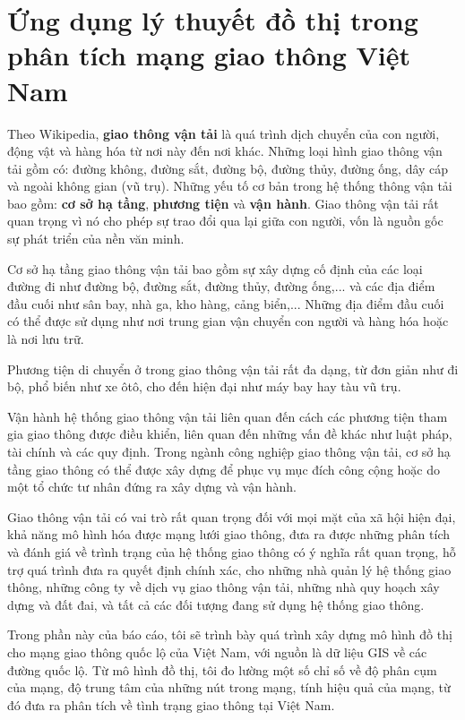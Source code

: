 \documentclass[14pt, oneside, a4paper, openany]{scrartcl}
\begin{document}
\newpage
\section{Ứng dụng lý thuyết đồ thị trong phân tích mạng giao thông Việt Nam}
Theo Wikipedia, \textbf{giao thông vận tải}  là quá trình dịch chuyển của con người, động vật và hàng hóa từ nơi này đến nơi khác. Những loại hình giao thông vận tải gồm có: đường không, đường sắt, đường bộ, đường thủy, đường ống, dây cáp và ngoài không gian (vũ trụ). Những yếu tố cơ bản trong hệ thống thông vận tải bao gồm: \textbf{cơ sở hạ tầng}, \textbf{phương tiện} và \textbf{vận hành}. Giao thông vận tải rất quan trọng vì nó cho phép sự trao đổi qua lại giữa con người, vốn là nguồn gốc sự phát triển của nền văn minh.

Cơ sở hạ tầng giao thông vận tải bao gồm sự xây dựng cố định của các loại đường đi như đường bộ, đường sắt, đường thủy, đường ống,... và các địa điểm đầu cuối như sân bay, nhà ga, kho hàng, cảng biển,... Những địa điểm đầu cuối có thể được sử dụng như nơi trung gian vận chuyển con người và hàng hóa hoặc là nơi lưu trữ.

Phương tiện di chuyển ở trong giao thông vận tải rất đa dạng, từ đơn giản như đi bộ, phổ biến như xe ôtô, cho đến hiện đại như máy bay hay tàu vũ trụ.

Vận hành hệ thống giao thông vận tải liên quan đến cách các phương tiện tham gia giao thông được điều khiển, liên quan đến những vấn đề khác như luật pháp, tài chính và các quy định. Trong ngành công nghiệp giao thông vận tải, cơ sở hạ tầng giao thông có thể được xây dựng để phục vụ mục đích công cộng hoặc do một tổ chức tư nhân đứng ra xây dựng và vận hành.

Giao thông vận tải có vai trò rất quan trọng đối với mọi mặt của xã hội hiện đại, khả năng mô hình hóa được mạng lưới giao thông, đưa ra được những phân tích và đánh giá về trình trạng của hệ thống giao thông có ý nghĩa rất quan trọng, hỗ trợ quá trình đưa ra quyết định chính xác, cho những nhà quản lý hệ thống giao thông, những công ty về dịch vụ giao thông vận tải, những nhà quy hoạch xây dựng và đất đai, và tất cả các đối tượng đang sử dụng hệ thống giao thông.

Trong phần này của báo cáo, tôi sẽ trình bày quá trình xây dựng mô hình đồ thị cho mạng giao thông quốc lộ của Việt Nam, với nguồn là dữ liệu GIS về các đường quốc lộ. Từ mô hình đồ thị, tôi đo lường một số chỉ số về độ phân cụm của mạng, độ trung tâm của những nút trong mạng, tính hiệu quả của mạng, từ đó đưa ra phân tích về tình trạng giao thông tại Việt Nam.
\end{document}

